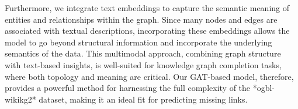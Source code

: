 \documentclass{article}
\begin{document}
Furthermore, we integrate text embeddings to capture the semantic meaning of entities and relationships within the graph. Since many nodes and edges are associated with textual descriptions, incorporating these embeddings allows the model to go beyond structural information and incorporate the underlying semantics of the data. This multimodal approach, combining graph structure with text-based insights, is well-suited for knowledge graph completion tasks, where both topology and meaning are critical. Our GAT-based model, therefore, provides a powerful method for harnessing the full complexity of the *ogbl-wikikg2* dataset, making it an ideal fit for predicting missing links.



\end{document}
